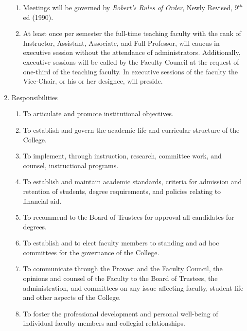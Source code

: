 \begin{enumerate}[label=\alph*)]
{\begin{enumerate}[label=\arabic*)]
							\item{
								\label{sec:FacultyMeetings-Procedures-RobertsRules}
								Meetings will be governed by \emph{Robert's Rules of Order}, Newly Revised, $9^{th}$ ed (1990).}
							\item{At least once per semester the full-time teaching faculty with the rank of Instructor, Assistant, Associate, and Full Professor, will caucus in executive session without the attendance of administrators.  Additionally, executive sessions will be called by the Faculty Council at the request of one-third of the teaching faculty.  In executive sessions of the faculty the Vice-Chair, or his or her designee, will preside.}
						\end{enumerate}
					}
					\item{Responsibilities
						\begin{enumerate}[label=\arabic*)]
							\item{To articulate and promote institutional objectives.}
							\item{To establish and govern the academic life and curricular structure of the College.}
							\item{To implement, through instruction, research, committee work, and counsel, instructional programs.}
							\item{To establish and maintain academic standards, criteria for admission and retention of students, degree requirements, and policies relating to financial aid.}
							\item{To recommend to the Board of Trustees for approval all candidates for degrees.}
							\item{To establish and to elect faculty members to standing and ad hoc committees for the governance of the College.}
							\item{To communicate through the Provost and the Faculty Council, the opinions and counsel of the Faculty to the Board of Trustees, the administration, and committees on any issue affecting faculty, student life and other aspects of the College.}
							\item{To foster the professional development and personal well-being of individual faculty members and collegial relationships.}
						\end{enumerate}
					}
				\end{enumerate}
